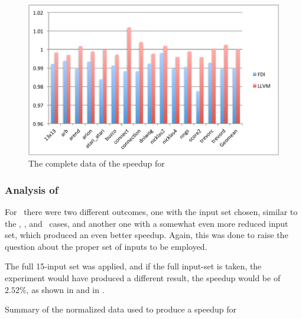 \begin{figure}
  \centering
  \includegraphics[width=1.00\linewidth]{Figures/speedupgbkall}
  \caption{The complete data of the speedup for \gobmk}
  \label{fig:gobmkall}
\end{figure}


\subsubsection{Analysis of \gcc}

For \gcc\ there were two different outcomes, one with the input set chosen, similar to the \bzip, \gzip, and \gobmk\ cases, and another one with a somewhat even more reduced input set, which produced an even better speedup. Again, this was done to raise the question about the proper set of inputs to be employed.

The full 15-input set was applied, and if the full input-set is taken, the experiment would have produced a different result, the speedup would be of $2.52 \%$, as shown in  and in .

\begin{table}
  \centering
  \begin{tiny}
  
  \end{tiny}
  \caption{Summary of the normalized data used to produce a speedup for \gcc}
  \label{tab:fullspeedup}
\end{table}

